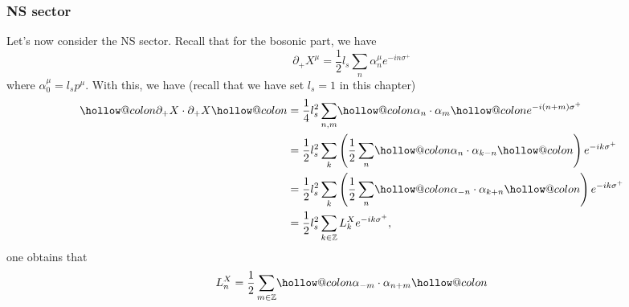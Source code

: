 \documentclass[graybox,envcountchap,sectrefs]{svmono}
\makeatletter
\newcommand{\hollowcolon}{\mathpalette\hollow@colon\relax}
\newcommand{\hollow@colon}[2]{%
  \mspace{1mu}%
  \vbox{%
    \hbox{$\m@th#1\smallcirc$}
    \nointerlineskip
    \kern.45ex
    \hbox{$\m@th#1\smallcirc$}
    \kern-.06ex
  }%
  \mspace{1mu}%
}
\newcommand{\hcolondel}[1]{%
  \mathopen{\hollowcolon}#1\mathclose{\hollowcolon}%
}
\makeatother
\begin{document}
\subsubsection*{NS sector} 
Let's now consider the NS sector.
Recall that for the bosonic part, we have
\begin{equation}
\partial_{+} X^{\mu}=\frac{1}{2} l_{s} \sum_{n} \alpha_{n}^{\mu} e^{-i n \sigma^{+}}
\end{equation}
where $\alpha_{0}^{\mu}=l_{s} p^{\mu} .$ With this, we have (recall that we have set $l_s=1$ in this chapter)
\begin{equation}
\begin{aligned}
\hcolondel{ \partial_{+} X \cdot \partial_{+} X} &=\frac{1}{4} l_{s}^{2} \sum_{n, m} \hcolondel{ \alpha_{n} \cdot \alpha_{m}} e^{-i(n+m) \sigma^{+}} \\
&=\frac{1}{2} l_{s}^{2} \sum_{k}\left(\frac{1}{2} \sum_{n}\hcolondel{ \alpha_{n} \cdot \alpha_{k-n}}\right) e^{-i k \sigma^{+}} \\
&=\frac{1}{2} l_{s}^{2} \sum_{k}\left(\frac{1}{2} \sum_{n}\hcolondel{ \alpha_{-n} \cdot \alpha_{k+n}}\right) e^{-i k \sigma^{+}} \\
&=\frac{1}{2} l_{s}^{2} \sum_{k \in \mathbb{Z}} L_{k}^{X} e^{-i k \sigma^{+}},
\end{aligned}
\end{equation}
one obtains that
\begin{equation}
L_{n}^{X}=\frac{1}{2} \sum_{m \in \mathbb{Z}}\hcolondel{\alpha_{-m} \cdot \alpha_{n+m}}
\end{equation}
\end{document}

